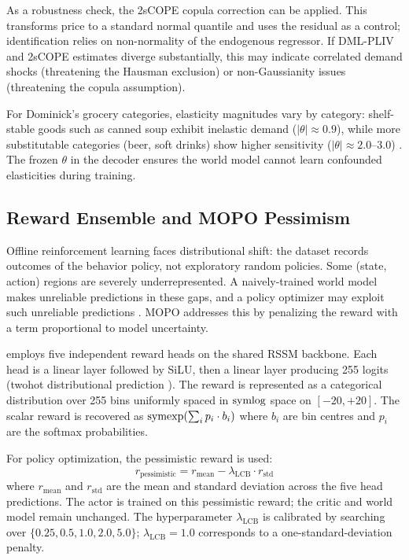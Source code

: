 As a robustness check, the 2sCOPE copula correction \citep{park2010copula} can be applied. This transforms price to a standard normal quantile and uses the residual as a control; identification relies on non-normality of the endogenous regressor. If DML-PLIV and 2sCOPE estimates diverge substantially, this may indicate correlated demand shocks (threatening the Hausman exclusion) or non-Gaussianity issues (threatening the copula assumption).

For Dominick's grocery categories, elasticity magnitudes vary by category: shelf-stable goods such as canned soup exhibit inelastic demand ($|\theta| \approx 0.9$), while more substitutable categories (beer, soft drinks) show higher sensitivity ($|\theta| \approx 2.0$--$3.0$) \citep{hoch1995determinants, nevo2001measuring}. The frozen $\theta$ in the decoder ensures the world model cannot learn confounded elasticities during training.

\subsection{Reward Ensemble and MOPO Pessimism}

Offline reinforcement learning faces distributional shift: the dataset records outcomes of the behavior policy, not exploratory random policies. Some (state, action) regions are severely underrepresented. A naively-trained world model makes unreliable predictions in these gaps, and a policy optimizer may exploit such unreliable predictions \citep{levine2020offline}. MOPO \citep{yu2020mopo} addresses this by penalizing the reward with a term proportional to model uncertainty.

\dreamprice{} employs five independent reward heads on the shared RSSM backbone. Each head is a linear layer followed by SiLU, then a linear layer producing 255 logits (twohot distributional prediction \citep{bellemare2017distributional}). The reward is represented as a categorical distribution over 255 bins uniformly spaced in $\operatorname{symlog}$ space on $[-20, +20]$. The scalar reward is recovered as $\operatorname{symexp}(\sum_i p_i \cdot b_i)$ where $b_i$ are bin centres and $p_i$ are the softmax probabilities.

For policy optimization, the pessimistic reward is used:
\begin{equation}
r_{\text{pessimistic}} = r_{\text{mean}} - \lambda_{\text{LCB}} \cdot r_{\text{std}}
\end{equation}
where $r_{\text{mean}}$ and $r_{\text{std}}$ are the mean and standard deviation across the five head predictions. The actor is trained on this pessimistic reward; the critic and world model remain unchanged. The hyperparameter $\lambda_{\text{LCB}}$ is calibrated by searching over $\{0.25, 0.5, 1.0, 2.0, 5.0\}$; $\lambda_{\text{LCB}} = 1.0$ corresponds to a one-standard-deviation penalty.

